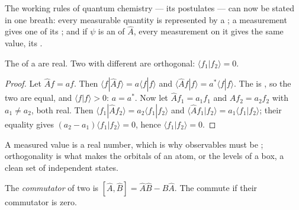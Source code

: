 The working rules of quantum chemistry --- its postulates --- can now be
stated in one breath: every measurable quantity is represented by a
; a measurement gives one of its ; and if
$\psi$ is an  of $\hat A$, every measurement on it gives the
same value, its .

\begin{theorem}\label{thm:b3:quantum-model-systems:hermitian-real}
The  of a  are real. Two  with
different  are orthogonal: $\langle f_1|f_2\rangle = 0$.
\end{theorem}

\begin{proof}
Let $\hat Af = af$. Then $\langle f|\hat Af\rangle = a\langle f|f\rangle$ and
$\langle\hat Af|f\rangle = a^*\langle f|f\rangle$. The  is ,
so the two are equal, and $\langle f|f\rangle > 0$: $a = a^*$. Now let $\hat Af_1
= a_1f_1$ and $\hat Af_2 = a_2f_2$ with $a_1 \ne a_2$, both real. Then
$\langle f_1|\hat Af_2\rangle = a_2\langle f_1|f_2\rangle$ and $\langle\hat Af_1|
f_2\rangle = a_1\langle f_1|f_2\rangle$; their equality gives $(a_2 - a_1)
\langle f_1|f_2\rangle = 0$, hence $\langle f_1|f_2\rangle = 0$.
\end{proof}

A measured value is a real number, which is why observables must be
; orthogonality is what makes the orbitals of an atom, or the
levels of a box, a clean set of independent states.

\begin{definition}[Commutator]\label{def:b3:quantum-model-systems:commutator}
The \emph{commutator} of two  is $[\hat A,\hat B] =
\hat A\hat B - \hat B\hat A$. The  commute if their commutator is
zero.
\end{definition}

